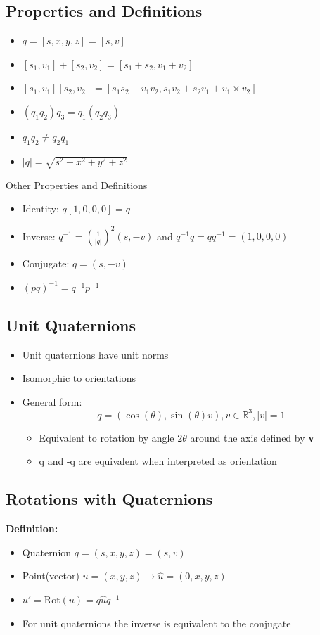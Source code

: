 \documentclass{article}
\newcommand{\R}{\mathbb{R}} %
\begin{document}
\subsection*{Properties and Definitions}
\begin{itemize}
    \item $q = [s, x, y, z] = [s, v]$
    \item $[s_1, v_1] + [s_2, v_2] = [s_1 + s_2, v_1 + v_2]$
    \item $[s_1, v_1][s_2, v_2] = [s_1s_2 - v_1v_2, s_1v_2 + s_2v_1 + v_1 \times v_2]$
    \item $(q_1 q_2)q_3 = q_1 (q_2 q_3)$
    \item $q_1 q_2 \neq q_2 q_1$
    \item $\vert q \vert = \sqrt{s^2 + x^2 + y^2 + z^2}$
\end{itemize}
Other Properties and Definitions
\begin{itemize}
    \item Identity: $q[1, 0, 0, 0] = q$
    \item Inverse: $q^{-1} = (\frac{1}{\vert q \vert})^2(s, -v)$ and $q^{-1}q = qq^{-1} = (1, 0, 0, 0)$
    \item Conjugate: $\bar q = (s, -v)$
    \item $(pq)^{-1} = q^{-1}p^{-1}$
\end{itemize}

\subsection*{Unit Quaternions}
\begin{itemize}
    \item Unit quaternions have unit norms 
    \item Isomorphic to orientations
    \item General form:
    \[q = (\cos(\theta), \sin(\theta)v), v \in \R^3, \vert v \vert = 1\]
    \begin{itemize}
        \item Equivalent to rotation by angle $2\theta$ around the axis defined by \textbf{v}
        \item q and -q are equivalent when interpreted as orientation
    \end{itemize}
\end{itemize}

\subsection*{Rotations with Quaternions}
\textbf{Definition:}
\begin{itemize}
    \item Quaternion $q = (s, x, y, z) = (s, v)$
    \item Point(vector) $u = (x, y, z) \rightarrow \hat u = (0, x, y, z)$
    \item $u' = \text{Rot}(u) = q\hat uq^{-1}$
    \item For unit quaternions the inverse is equivalent to the conjugate
\end{itemize}
\end{document}
